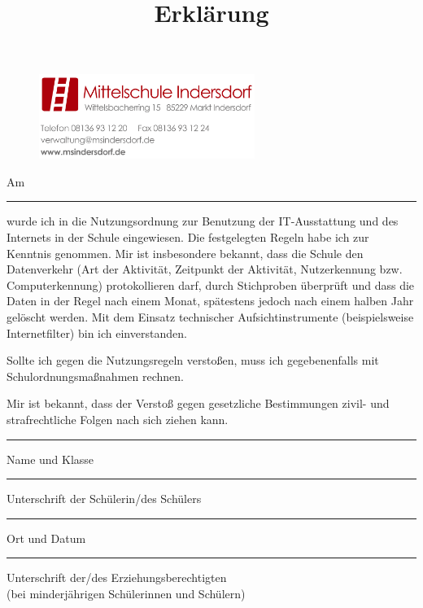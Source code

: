 \documentclass[a4paper, parskip]{scrartcl}
\title{Erklärung}
\date{}
\begin{document}
\thispagestyle{empty}

\begin{figure}
	\flushright
	\includegraphics[width=7cm]{logo_briefkopf}
	\vspace{4cm}
\end{figure}


Am \rule{2cm}{.3pt} wurde ich in die Nutzungsordnung zur Benutzung der
IT-Ausstattung und des Internets in der Schule eingewiesen. Die festgelegten
Regeln habe ich zur Kenntnis genommen. Mir ist insbesondere bekannt, dass die
Schule den Datenverkehr (Art der Aktivität, Zeitpunkt der Aktivität,
Nutzerkennung bzw. Computerkennung) protokollieren darf, durch Stichproben
überprüft und dass die Daten in der Regel nach einem Monat, spätestens jedoch
nach einem halben Jahr gelöscht werden. Mit dem Einsatz technischer
Aufsichtinstrumente (beispielsweise Internetfilter) bin ich einverstanden.

Sollte ich gegen die Nutzungsregeln verstoßen, muss ich gegebenenfalls mit
Schulordnungsmaßnahmen rechnen.

Mir ist bekannt, dass der Verstoß gegen gesetzliche Bestimmungen zivil- und
strafrechtliche Folgen nach sich ziehen kann. \\
\vspace{2cm}

\parbox{6cm}{\hrule
\strut \footnotesize Name und Klasse}
\hfill\parbox{7cm}{\hrule
\strut \footnotesize Unterschrift der Schülerin/des Schülers}

\parbox{6cm}{\hrule
\strut \footnotesize Ort und Datum}
\hfill\parbox{7cm}{\hrule
\strut \footnotesize Unterschrift der/des Erziehungsberechtigten \\(bei
minderjährigen Schülerinnen und Schülern)}
\end{document}

